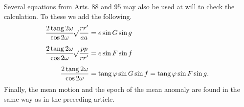 Several equations from Arts. 88 and 95 may also be used at will to check the calculation. To these we add the following.
\[
\begin{aligned}
\dfrac{2\operatorname{tang}2\omega}{\cos 2\omega}\mathord{{}^{}\!\surd}\dfrac{rr'}{aa}&=e\sin G\sin g\\[6pt]
\dfrac{2\operatorname{tang}2\omega}{\cos 2\omega}\mathord{{}^{}\!\surd}\dfrac{pp}{rr'}&=e\sin F\sin f\\[6pt]
\dfrac{2\operatorname{tang}2\omega}{\cos 2\omega}&=\operatorname{tang}\varphi\sin G\sin f=\operatorname{tang}\varphi\sin F\sin g.
\end{aligned}
\]
Finally, the mean motion and the epoch of the mean anomaly are found in the same way as in the preceding article.

